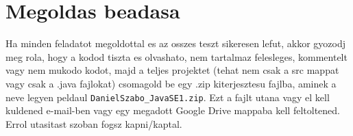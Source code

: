 \documentclass{article}
\begin{document}
\section{Megoldas beadasa}
Ha minden feladatot megoldottal es az osszes teszt sikeresen lefut, akkor gyozodj meg rola, hogy a kodod tiszta es olvashato, nem tartalmaz felesleges, kommentelt vagy nem mukodo kodot, majd a teljes projektet (tehat nem csak a src mappat vagy csak a .java fajlokat) csomagold be egy .zip kiterjesztesu fajlba, aminek a neve legyen peldaul \lstinline{DanielSzabo_JavaSE1.zip}. Ezt a fajlt utana vagy el kell kuldened e-mail-ben vagy egy megadott Google Drive mappaba kell feltoltened. Errol utasitast szoban fogsz kapni/kaptal.
\end{document}
